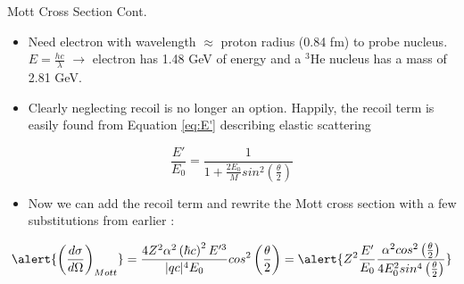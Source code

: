 \documentclass[10pt]{beamer}
\begin{document}
\begin{frame}[fragile]{Mott Cross Section Cont.}
	\begin{itemize}
		\item Need electron with wavelength $\approx$ proton radius (0.84 fm) to probe nucleus. $E=\frac{hc}{\lambda}$ $\rightarrow$ \alert{electron has 1.48 GeV of energy} and a \alert{$^3$He nucleus has a mass of 2.81 GeV}.
		\pause
		\item Clearly neglecting recoil is no longer an option. Happily, the recoil term is easily found from Equation \ref{eq:E'} describing elastic scattering
	\end{itemize}
	
	\begin{equation} \label{eq:recoil}
	\frac{E'}{E_0} = \frac{1}{1+\frac{2E_0}{M} sin^2 \left( \frac{\theta}{2} \right)}
	\end{equation}
	\pause
	\begin{itemize}
		\item Now we can add the recoil term and rewrite the Mott cross section with a few substitutions from earlier \cite{Book:Povh}:
	\end{itemize}		
	
	\begin{equation} \label{eq:mott_recoil}
	\alert{\left(\frac{d\sigma}{d\Omega}\right)_{Mott}} = \frac{4Z^2\alpha^2\left(\hbar c\right)^2E'^3}{|qc|^4 E_0} cos^2 \left( \frac{\theta}{2} \right) = \alert{Z^2 \frac{E'}{E_0} \frac{\alpha^2 cos^2\left( \frac{\theta}{2} \right)}{4E_0^2 sin^4\left( \frac{\theta}{2} \right)}}
	\end{equation}
	
\end{frame}
\end{document}
